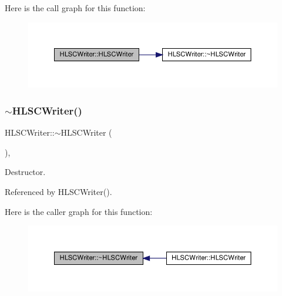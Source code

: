 Here is the call graph for this function\+:
\nopagebreak
\begin{figure}[H]
\begin{center}
\leavevmode
\includegraphics[width=350pt]{d4/db1/classHLSCWriter_a03b5e7b5c529d4de7a9ffbdf6146a604_cgraph}
\end{center}
\end{figure}
\mbox{\label{classHLSCWriter_aa59a87b90d09bd62acbf064d8378824c}} 
\subsubsection{\texorpdfstring{$\sim$\+H\+L\+S\+C\+Writer()}{~HLSCWriter()}}
{\footnotesize\ttfamily H\+L\+S\+C\+Writer\+::$\sim$\+H\+L\+S\+C\+Writer (\begin{DoxyParamCaption}{ }\end{DoxyParamCaption})\hspace{0.3cm}{\ttfamily [virtual]}, {\ttfamily [default]}}



Destructor. 



Referenced by H\+L\+S\+C\+Writer().

Here is the caller graph for this function\+:
\nopagebreak
\begin{figure}[H]
\begin{center}
\leavevmode
\includegraphics[width=350pt]{d4/db1/classHLSCWriter_aa59a87b90d09bd62acbf064d8378824c_icgraph}
\end{center}
\end{figure}


